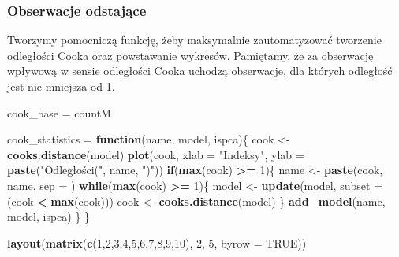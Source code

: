 \documentclass[
]{article}
\newenvironment{Shaded}{\begin{snugshade}}{\end{snugshade}}
\newcommand{\AttributeTok}[1]{\textcolor[rgb]{0.13,0.29,0.53}{#1}}
\newcommand{\ConstantTok}[1]{\textcolor[rgb]{0.56,0.35,0.01}{#1}}
\newcommand{\ControlFlowTok}[1]{\textcolor[rgb]{0.13,0.29,0.53}{\textbf{#1}}}
\newcommand{\DecValTok}[1]{\textcolor[rgb]{0.00,0.00,0.81}{#1}}
\newcommand{\FunctionTok}[1]{\textcolor[rgb]{0.13,0.29,0.53}{\textbf{#1}}}
\newcommand{\NormalTok}[1]{#1}
\newcommand{\OtherTok}[1]{\textcolor[rgb]{0.56,0.35,0.01}{#1}}
\newcommand{\SpecialCharTok}[1]{\textcolor[rgb]{0.81,0.36,0.00}{\textbf{#1}}}
\newcommand{\StringTok}[1]{\textcolor[rgb]{0.31,0.60,0.02}{#1}}
\begin{document}
\subsubsection{Obserwacje odstające}\label{obserwacje-odstajux105ce}

Tworzymy pomocniczą funkcję, żeby maksymalnie zautomatyzować tworzenie
odległości Cooka oraz powstawanie wykresów. Pamiętamy, że za obserwację
wpływową w sensie odległości Cooka uchodzą obserwacje, dla których
odległość jest nie mniejsza od 1.

\begin{Shaded}
\begin{Highlighting}[]
\NormalTok{cook\_base }\OtherTok{=}\NormalTok{ countM}

\NormalTok{cook\_statistics }\OtherTok{=} \ControlFlowTok{function}\NormalTok{(name, model, ispca)\{}
\NormalTok{  cook }\OtherTok{\textless{}{-}} \FunctionTok{cooks.distance}\NormalTok{(model)}
  \FunctionTok{plot}\NormalTok{(cook, }\AttributeTok{xlab =} \StringTok{"Indeksy"}\NormalTok{,  }\AttributeTok{ylab =} \FunctionTok{paste}\NormalTok{(}\StringTok{"Odległości("}\NormalTok{, name, }\StringTok{")"}\NormalTok{))}
  \ControlFlowTok{if}\NormalTok{(}\FunctionTok{max}\NormalTok{(cook) }\SpecialCharTok{\textgreater{}=} \DecValTok{1}\NormalTok{)\{}
\NormalTok{    name }\OtherTok{\textless{}{-}} \FunctionTok{paste}\NormalTok{(}\StringTok{\textquotesingle{}cook\textquotesingle{}}\NormalTok{, name, }\AttributeTok{sep =} \StringTok{\textquotesingle{} \textquotesingle{}}\NormalTok{)}
    \ControlFlowTok{while}\NormalTok{(}\FunctionTok{max}\NormalTok{(cook) }\SpecialCharTok{\textgreater{}=} \DecValTok{1}\NormalTok{)\{}
\NormalTok{      model }\OtherTok{\textless{}{-}} \FunctionTok{update}\NormalTok{(model, }\AttributeTok{subset =}\NormalTok{ (cook }\SpecialCharTok{\textless{}} \FunctionTok{max}\NormalTok{(cook)))}
\NormalTok{      cook  }\OtherTok{\textless{}{-}} \FunctionTok{cooks.distance}\NormalTok{(model)}
\NormalTok{    \}}
    \FunctionTok{add\_model}\NormalTok{(name, model, ispca)}
\NormalTok{  \}}
\NormalTok{\}}

\FunctionTok{layout}\NormalTok{(}\FunctionTok{matrix}\NormalTok{(}\FunctionTok{c}\NormalTok{(}\DecValTok{1}\NormalTok{,}\DecValTok{2}\NormalTok{,}\DecValTok{3}\NormalTok{,}\DecValTok{4}\NormalTok{,}\DecValTok{5}\NormalTok{,}\DecValTok{6}\NormalTok{,}\DecValTok{7}\NormalTok{,}\DecValTok{8}\NormalTok{,}\DecValTok{9}\NormalTok{,}\DecValTok{10}\NormalTok{), }\DecValTok{2}\NormalTok{, }\DecValTok{5}\NormalTok{, }\AttributeTok{byrow =} \ConstantTok{TRUE}\NormalTok{))}


\end{Highlighting}
\end{Shaded}
\end{document}
